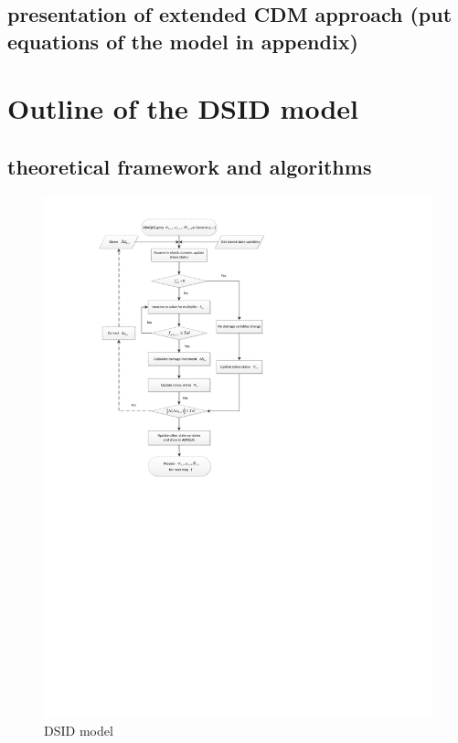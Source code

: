 \documentclass[preprint,review,12pt]{elsarticle}
\begin{document}
\subsection{presentation of extended CDM approach (put equations of the model in appendix)}


\section{Outline of the DSID model}
\subsection{theoretical framework and algorithms} 
\begin{figure}[htbp]
\begin{center}
\includegraphics[width=\textwidth]{flowchart2.pdf}
\caption{DSID model}
\label{fig:energy}
\end{center}
\end{figure}
\end{document}
